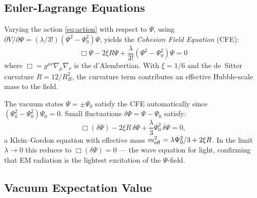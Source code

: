 \subsection{Euler-Lagrange Equations}

Varying the action \eqref{eq:action} with respect to $\Psi$, using
$\partial V/\partial\Psi = (\lambda/3!)(\Psi^2-\Psi_0^2)\Psi$, yields the
\emph{Cohesion Field Equation} (CFE):
\begin{equation}
\boxed{\Box\Psi - 2\xi R\Psi + \frac{\lambda}{3!}\!\left(\Psi^2 - \Psi_0^2\right)\Psi = 0}
\label{eq:field_equation}
\end{equation}
where $\Box = g^{\mu\nu}\nabla_\mu\nabla_\nu$ is the d'Alembertian. With $\xi=1/6$ and the de~Sitter curvature $R=12/R_H^2$, the curvature term contributes an effective Hubble-scale mass to the field.

The vacuum states $\Psi = \pm\Psi_0$ satisfy the CFE automatically since
$(\Psi_0^2-\Psi_0^2)\Psi_0 = 0$. Small fluctuations $\delta\Psi = \Psi - \Psi_0$ satisfy:
\begin{equation}
\Box(\delta\Psi) - 2\xi R\,\delta\Psi + \frac{\lambda}{3}\Psi_0^2\,\delta\Psi = 0,
\label{eq:vacuum_eq}
\end{equation}
a Klein--Gordon equation with effective mass $m_{\rm eff}^2 = \lambda\Psi_0^2/3 + 2\xi R$. In the limit $\lambda\to 0$ this reduces to $\Box(\delta\Psi)=0$ --- the wave equation for light, confirming that EM radiation is the lightest excitation of the $\Psi$-field.

\subsection{Vacuum Expectation Value}
\label{sec:vacuum}

